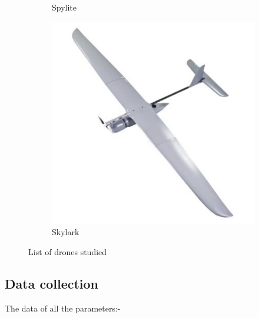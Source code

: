 \documentclass[12 pt]{article}
\begin{document}
\begin{figure}
\begin{subfigure}{.4\textwidth}
        \caption{Spylite}
        \label{Spylite}
    \end{subfigure}
    \centering
    \begin{subfigure}{.4\textwidth}
        \centering
        \includegraphics[width = 0.9\linewidth]{Aircraft pics/Skylark.jpg}
        \caption{Skylark}
        \label{Skylark}
    \end{subfigure}
    \caption{List of drones studied}
    \label{Drone pictures}
\end{figure}


\subsection {{Data collection}}

The data of all the parameters:-
\end{document}
